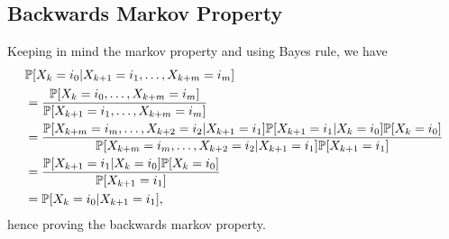 \subsection{Backwards Markov Property}
Keeping in mind the markov property and using Bayes rule, we have
\begin{align*}
    &\P[X_k = i_0 | X_{k + 1} = i_1, \dots, X_{k + m} = i_{m}] \\
    &= \frac{\P[X_k = i_0, \dots, X_{k + m} = i_m]}{\P[X_{k + 1} = i_1, \dots, X_{k + m} = i_m]} \\
    &= \frac{\P[X_{k + m} = i_m, \dots, X_{k + 2} = i_2 | X_{k + 1} = i_1]\P[X_{k + 1} = i_1 | X_k = i_0]\P[X_k = i_0]}{\P[X_{k + m} = i_m, \dots, X_{k + 2} = i_2 | X_{k + 1} = i_1]\P[X_{k + 1} = i_1]} \\
    &= \frac{\P[X_{k + 1} = i_1 | X_k = i_0]\P[X_k = i_0]}{\P[X_{k + 1} = i_1]} \\
    &= \P[X_k = i_0 | X_{k + 1} = i_1],
\end{align*}
hence proving the backwards markov property.
